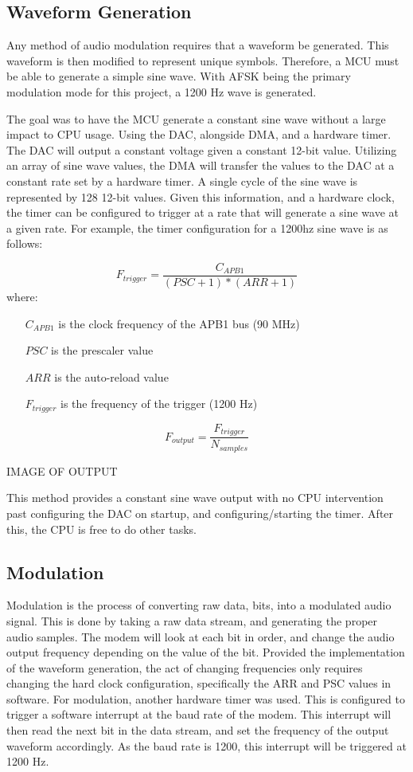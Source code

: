 \documentclass{journal}
\begin{document}
\subsection{Waveform Generation}
Any method of audio modulation requires that a waveform be generated. This waveform is then modified to represent unique symbols. Therefore, a MCU must be able to generate a simple sine wave. With AFSK being the primary modulation mode for this project, a 1200 Hz wave is generated.

The goal was to have the MCU generate a constant sine wave without a large impact to CPU usage. Using the DAC, alongside DMA, and a hardware timer. The DAC will output a constant voltage given a constant 12-bit value. Utilizing an array of sine wave values, the DMA will transfer the values to the DAC at a constant rate set by a hardware timer. A single cycle of the sine wave is represented by 128 12-bit values. Given this information, and a hardware clock, the timer can be configured to trigger at a rate that will generate a sine wave at a given rate. For example, the timer configuration for a 1200hz sine wave is as follows:

\[
  F_{trigger} = \frac{C_{APB1}}{(PSC+1)*(ARR+1)}
\]
where:
\begin{itemize}
  \item[$C_{APB1}$] is the clock frequency of the APB1 bus (90 MHz)
  \item[$PSC$] is the prescaler value
  \item[$ARR$] is the auto-reload value
  \item[$F_{trigger}$] is the frequency of the trigger (1200 Hz)
\end{itemize}

\[
  F_{output} = \frac{F_{trigger}}{N_{samples}}
\]

IMAGE OF OUTPUT

This method provides a constant sine wave output with no CPU intervention past configuring the DAC on startup, and configuring/starting the timer. After this, the CPU is free to do other tasks.

\subsection{Modulation}

Modulation is the process of converting raw data, bits, into a modulated audio signal. This is done by taking a raw data stream, and generating the proper audio samples. The modem will look at each bit in order, and change the audio output frequency depending on the value of the bit. Provided the implementation of the waveform generation, the act of changing frequencies only requires changing the hard clock configuration, specifically the ARR and PSC values in software. For modulation, another hardware timer was used. This is configured to trigger a software interrupt at the baud rate of the modem. This interrupt will then read the next bit in the data stream, and set the frequency of the output waveform accordingly. As the baud rate is 1200, this interrupt will be triggered at 1200 Hz.
\end{document}
